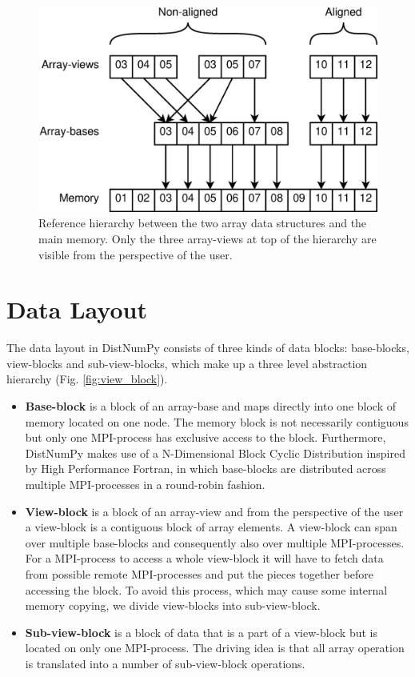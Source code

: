 \documentclass{acm_proc_article-sp}
\begin{document}
\begin{figure}
 \centering
 \includegraphics[width=\linewidth]{gfx/views}
 \caption{Reference hierarchy between the two array data structures and the main memory. Only the three array-views at top of the hierarchy are visible from the perspective of the user.}
 \label{fig:views}
\end{figure}

\section{Data Layout}
The data layout in DistNumPy consists of three kinds of data blocks: base-blocks, view-blocks and sub-view-blocks, which make up a three level abstraction hierarchy (Fig. \ref{fig:view_block}).

\begin{itemize}
\item \textbf{Base-block} is a block of an array-base and maps directly into one block of memory located on one node. The memory block is not necessarily contiguous but only one MPI-process has exclusive access to the block. Furthermore, DistNumPy makes use of a N-Dimensional Block Cyclic Distribution inspired by High Performance Fortran\cite{Loveman93}, in which base-blocks are distributed across multiple MPI-processes in a round-robin fashion.


\item \textbf{View-block} is a block of an array-view and from the perspective of the user a view-block is a contiguous block of array elements. A view-block can span over multiple base-blocks and consequently also over multiple MPI-processes. For a MPI-process to access a whole view-block it will have to fetch data from possible remote MPI-processes and put the pieces together before accessing the block. To avoid this process, which may cause some internal memory copying, we divide view-blocks into sub-view-block.

\item \textbf{Sub-view-block} is a block of data that is a part of a view-block but is located on only one MPI-process. The driving idea is that all array operation is translated into a number of sub-view-block operations.

\end{itemize}
\end{document}
